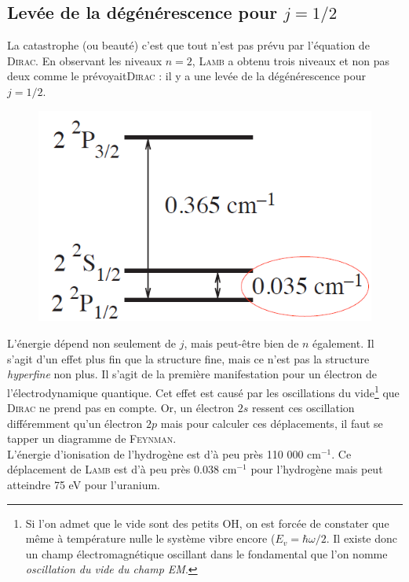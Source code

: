 \subsection{Levée de la dégénérescence pour $j=1/2$}
La catastrophe (ou beauté) c'est que tout n'est pas prévu par l'équation de \textsc{Dirac}. En 
observant les niveaux $n=2$, \textsc{Lamb} a obtenu trois niveaux et non pas deux comme le 
prévoyait\textsc{Dirac} : il y a une levée de la dégénérescence pour $j=1/2$.\\

	\begin{figure}
	\vspace{-5mm}
	\includegraphics[scale=0.4]{ch1/image10}
	\end{figure}
L'énergie dépend non seulement de $j$, mais peut-être bien de $n$ également. Il s'agit d'un effet 
plus fin que la structure fine, mais ce n'est pas la structure \textit{hyperfine} non plus. Il 
s'agit de la première manifestation pour un électron de l'électrodynamique quantique. Cet effet
est causé par les oscillations du vide\footnote{Si l'on admet que le vide sont des petits OH, on 
est forcée de constater que même à température nulle le système vibre encore ($E_v = \hbar\omega/2$.
Il existe donc un champ électromagnétique oscillant dans le fondamental que l'on nomme 
\textit{oscillation du vide du champ EM}.} que \textsc{Dirac} ne prend pas en compte. Or, un 
électron $2s$ ressent ces oscillation différemment qu'un électron $2p$ mais pour calculer ces 
déplacements, il faut se tapper un diagramme de \textsc{Feynman}.\\

L'énergie d'ionisation de l'hydrogène est d'à peu près 110 000 cm$^{-1}$. Ce déplacement de 
\textsc{Lamb} est d'à peu près 0.038 cm$^{-1}$ pour l'hydrogène mais peut atteindre 75 eV pour 
l'uranium.

